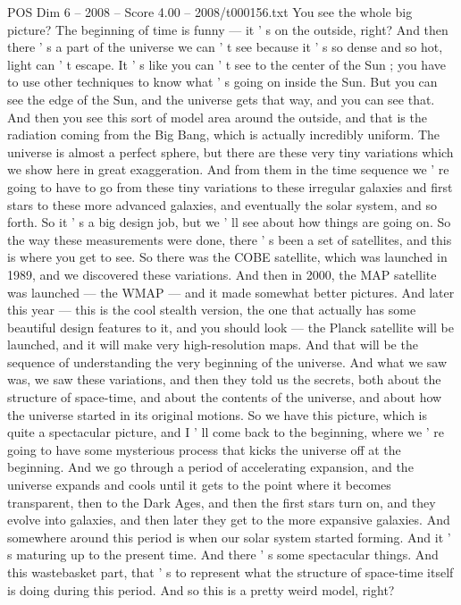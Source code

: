 \begin{textsample}{POS Dim 6 – 2008 – Score 4.00 – 2008/t000156.txt}
You see the whole big picture?
The beginning of time is funny — it ' s on the outside, right?
And then there ' s a part of the universe we can ' t see because it ' s so dense and so hot, light can ' t escape.
It ' s like you can ' t see to the center of the Sun ; you have to use other techniques to know what ' s going on inside the Sun.
But you can see the edge of the Sun, and the universe gets that way, and you can see that.
And then you see this sort of model area around the outside, and that is the radiation coming from the Big Bang, which is actually incredibly uniform.
The universe is almost a perfect sphere, but there are these very tiny variations which we show here in great exaggeration.
And from them in the time sequence we ' re going to have to go from these tiny variations to these irregular galaxies and first stars to these more advanced galaxies, and eventually the solar system, and so forth.
So it ' s a big design job, but we ' ll see about how things are going on.
So the way these measurements were done, there ' s been a set of satellites, and this is where you get to see.
So there was the COBE satellite, which was launched in 1989, and we discovered these variations.
And then in 2000, the MAP satellite was launched — the WMAP — and it made somewhat better pictures.
And later this year — this is the cool stealth version, the one that actually has some beautiful design features to it, and you should look — the Planck satellite will be launched, and it will make very high-resolution maps.
And that will be the sequence of understanding the very beginning of the universe.
And what we saw was, we saw these variations, and then they told us the secrets, both about the structure of space-time, and about the contents of the universe, and about how the universe started in its original motions.
So we have this picture, which is quite a spectacular picture, and I ' ll come back to the beginning, where we ' re going to have some mysterious process that kicks the universe off at the beginning.
And we go through a period of accelerating expansion, and the universe expands and cools until it gets to the point where it becomes transparent, then to the Dark Ages, and then the first stars turn on, and they evolve into galaxies, and then later they get to the more expansive galaxies.
And somewhere around this period is when our solar system started forming.
And it ' s maturing up to the present time.
And there ' s some spectacular things.
And this wastebasket part, that ' s to represent what the structure of space-time itself is doing during this period.
And so this is a pretty weird model, right?

\end{textsample}
